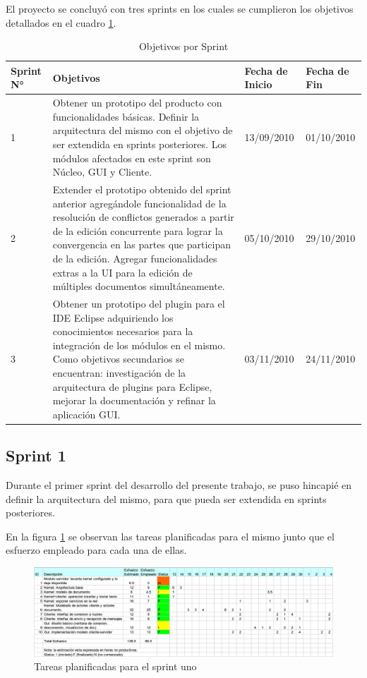 \documentclass[12pt,a4paper]{article}
\begin{document}
El proyecto se concluyó con tres sprints en los cuales se cumplieron los objetivos detallados en el cuadro \ref{objetivos_por_sprint}.

\begin{table}
    \begin{tabular}{ | l | p{6.5cm} | p{2cm} | p{2cm} | }
    \hline
	Sprint N° & Objetivos & Fecha de Inicio & Fecha de Fin \\ \hline

	1 & Obtener un prototipo del producto con funcionalidades básicas. Definir la arquitectura del mismo con el
	objetivo de ser extendida en sprints posteriores. Los módulos afectados en este sprint son Núcleo, GUI y Cliente.
	& 13/09/2010 & 01/10/2010 \\ \hline

	2 & Extender el prototipo obtenido del sprint anterior agregándole funcionalidad de la resolución de conflictos
	generados a partir de la edición concurrente para lograr la convergencia en las partes que participan de la edición.
	Agregar funcionalidades extras a la UI para la edición de múltiples documentos simultáneamente.
	& 05/10/2010 & 29/10/2010 \\ \hline

	3 & Obtener un prototipo del plugin para el IDE Eclipse adquiriendo los conocimientos necesarios para la integración de los
	módulos en el mismo. Como objetivos secundarios se encuentran: investigación de la arquitectura de plugins para Eclipse, mejorar
	la documentación y refinar la aplicación GUI.
	& 03/11/2010 & 24/11/2010 \\ \hline

    \end{tabular}
    \caption{\label{objetivos_por_sprint} Objetivos por Sprint}
\end{table}

\subsection{Sprint 1}

Durante el primer sprint del desarrollo del presente trabajo, se puso hincapié en definir la arquitectura del mismo,
para que pueda ser extendida en sprints posteriores.

En la figura \ref{sprint1-tareas} se observan las tareas planificadas para el mismo junto que el esfuerzo empleado para
cada una de ellas.

	\begin{figure}[!ht]
		\begin{center}
			\includegraphics[width=14cm]{sprint1.png}
			\caption{\label{sprint1-tareas} Tareas planificadas para el sprint uno }
		\end{center}
	\end{figure}
\end{document}
